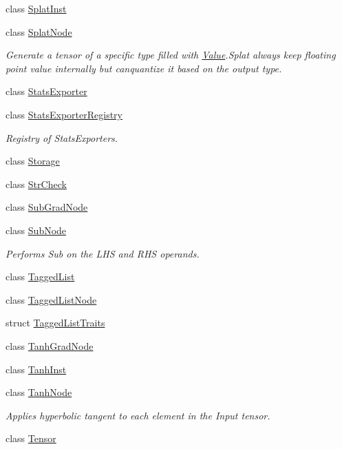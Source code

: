 \begin{DoxyCompactItemize}
class \hyperlink{classglow_1_1_splat_inst}{Splat\+Inst}
\item 
class \hyperlink{classglow_1_1_splat_node}{Splat\+Node}
\begin{DoxyCompactList}\small\item\em Generate a tensor of a specific type filled with \textquotesingle{}\hyperlink{classglow_1_1_value}{Value}\textquotesingle{}.Splat always keep floating point value internally but canquantize it based on the output type. \end{DoxyCompactList}\item 
class \hyperlink{classglow_1_1_stats_exporter}{Stats\+Exporter}
\item 
class \hyperlink{classglow_1_1_stats_exporter_registry}{Stats\+Exporter\+Registry}
\begin{DoxyCompactList}\small\item\em Registry of Stats\+Exporters. \end{DoxyCompactList}\item 
class \hyperlink{classglow_1_1_storage}{Storage}
\item 
class \hyperlink{classglow_1_1_str_check}{Str\+Check}
\item 
class \hyperlink{classglow_1_1_sub_grad_node}{Sub\+Grad\+Node}
\item 
class \hyperlink{classglow_1_1_sub_node}{Sub\+Node}
\begin{DoxyCompactList}\small\item\em Performs Sub on the L\+HS and R\+HS operands. \end{DoxyCompactList}\item 
class \hyperlink{classglow_1_1_tagged_list}{Tagged\+List}
\item 
class \hyperlink{classglow_1_1_tagged_list_node}{Tagged\+List\+Node}
\item 
struct \hyperlink{structglow_1_1_tagged_list_traits}{Tagged\+List\+Traits}
\item 
class \hyperlink{classglow_1_1_tanh_grad_node}{Tanh\+Grad\+Node}
\item 
class \hyperlink{classglow_1_1_tanh_inst}{Tanh\+Inst}
\item 
class \hyperlink{classglow_1_1_tanh_node}{Tanh\+Node}
\begin{DoxyCompactList}\small\item\em Applies hyperbolic tangent to each element in the Input tensor. \end{DoxyCompactList}\item 
class \hyperlink{classglow_1_1_tensor}{Tensor}

\end{DoxyCompactItemize}
